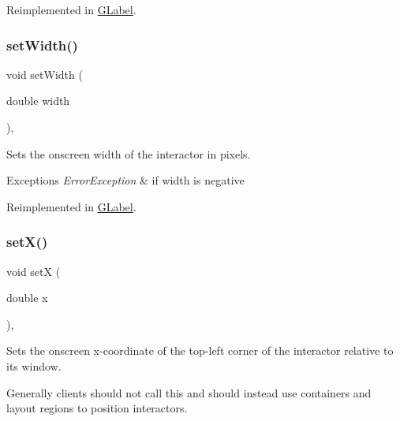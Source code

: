 Reimplemented in \mbox{\hyperlink{classGLabel_afcc2a51afef8e2e61d8d9191386fb93f}{G\+Label}}.

\mbox{\label{classGInteractor_aa3f3fba4cb131baa8696ba01e3bceca1}} 
\subsubsection{\texorpdfstring{set\+Width()}{setWidth()}}
{\footnotesize\ttfamily void set\+Width (\begin{DoxyParamCaption}\item[{double}]{width }\end{DoxyParamCaption})\hspace{0.3cm}{\ttfamily [virtual]}, {\ttfamily [inherited]}}



Sets the onscreen width of the interactor in pixels. 


\begin{DoxyExceptions}{Exceptions}
{\em Error\+Exception} & if width is negative \\
\hline
\end{DoxyExceptions}


Reimplemented in \mbox{\hyperlink{classGLabel_af0c5b6fb4e3c3c9a3fabde548efa93db}{G\+Label}}.

\mbox{\label{classGInteractor_a9c18fcc579333bf9653d13ad2b372e39}} 
\subsubsection{\texorpdfstring{set\+X()}{setX()}}
{\footnotesize\ttfamily void setX (\begin{DoxyParamCaption}\item[{double}]{x }\end{DoxyParamCaption})\hspace{0.3cm}{\ttfamily [virtual]}, {\ttfamily [inherited]}}



Sets the onscreen x-\/coordinate of the top-\/left corner of the interactor relative to its window. 

Generally clients should not call this and should instead use containers and layout regions to position interactors. 

